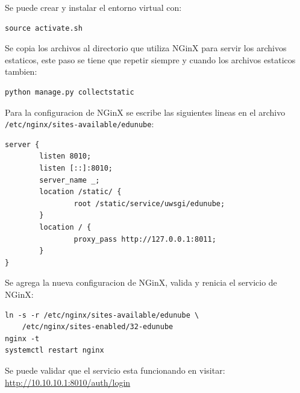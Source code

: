 Se puede crear y instalar el entorno virtual con:
\begin{lstlisting}
source activate.sh
\end{lstlisting}

Se copia los archivos al directorio que utiliza NGinX para servir los archivos estaticos, este paso se tiene que repetir siempre y cuando los archivos estaticos tambien:
\begin{lstlisting}
python manage.py collectstatic
\end{lstlisting}

Para la configuracion de NGinX se escribe las siguientes lineas en el archivo \\
\texttt{/etc/nginx/sites-available/edunube}:
\begin{lstlisting}
server {
        listen 8010;
        listen [::]:8010;
        server_name _;
        location /static/ {
                root /static/service/uwsgi/edunube;
        }
        location / {
                proxy_pass http://127.0.0.1:8011;
        }
}
\end{lstlisting}

Se agrega la nueva configuracion de NGinX, valida y renicia el servicio de NGinX:
\begin{lstlisting}
ln -s -r /etc/nginx/sites-available/edunube \ 
    /etc/nginx/sites-enabled/32-edunube
nginx -t
systemctl restart nginx
\end{lstlisting}

Se puede validar que el servicio esta funcionando en visitar: \url{http://10.10.10.1:8010/auth/login}

